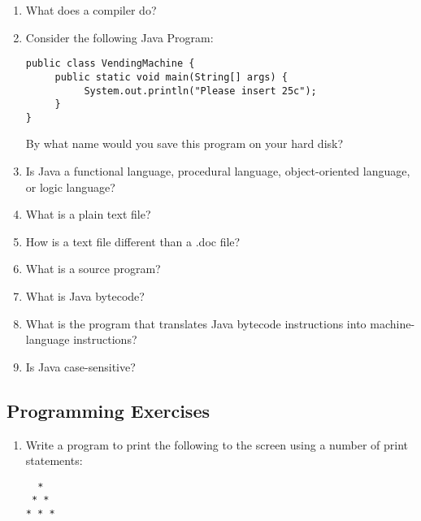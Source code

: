 \setcounter{counter}{1}
\begin{enumerate}[label={\arabic{counter}\addtocounter{counter}{1}}.]

\item What does a compiler do?

\item Consider the following Java Program:
\begin{lstlisting}
public class VendingMachine {
     public static void main(String[] args) {
          System.out.println("Please insert 25c");
     }
}
\end{lstlisting}
By what name would you save this program on your hard disk?

\item Is Java a functional language, procedural language, object-oriented language, or logic language?

\item What is a plain text file?

\item How is a text file different than a .doc file?

\item What is a source program?

\item What is Java bytecode?

\item What is the program that translates Java bytecode instructions into machine-language instructions?

\item Is Java case-sensitive?

\end{enumerate}

\subsection{Programming Exercises}

\begin{enumerate}[label={\arabic{counter}\addtocounter{counter}{1}}.]
\item Write a program to print the following to the screen using a number of print statements:
\begin{verbatim}
  *
 * *
* * *
\end{verbatim}
\end{enumerate}